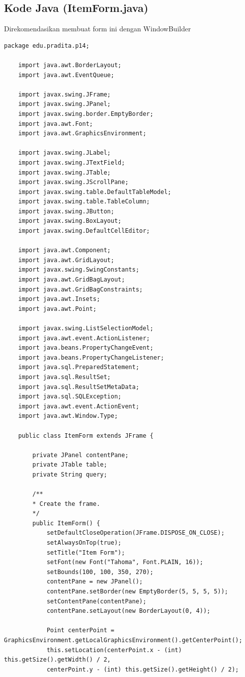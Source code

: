 \subsection{Kode Java (ItemForm.java)}

Direkomendasikan membuat form ini dengan WindowBuilder

\begin{lstlisting}[style=JavaStyle]
	package edu.pradita.p14;
	
	import java.awt.BorderLayout;
	import java.awt.EventQueue;
	
	import javax.swing.JFrame;
	import javax.swing.JPanel;
	import javax.swing.border.EmptyBorder;
	import java.awt.Font;
	import java.awt.GraphicsEnvironment;
	
	import javax.swing.JLabel;
	import javax.swing.JTextField;
	import javax.swing.JTable;
	import javax.swing.JScrollPane;
	import javax.swing.table.DefaultTableModel;
	import javax.swing.table.TableColumn;
	import javax.swing.JButton;
	import javax.swing.BoxLayout;
	import javax.swing.DefaultCellEditor;
	
	import java.awt.Component;
	import java.awt.GridLayout;
	import javax.swing.SwingConstants;
	import java.awt.GridBagLayout;
	import java.awt.GridBagConstraints;
	import java.awt.Insets;
	import java.awt.Point;
	
	import javax.swing.ListSelectionModel;
	import java.awt.event.ActionListener;
	import java.beans.PropertyChangeEvent;
	import java.beans.PropertyChangeListener;
	import java.sql.PreparedStatement;
	import java.sql.ResultSet;
	import java.sql.ResultSetMetaData;
	import java.sql.SQLException;
	import java.awt.event.ActionEvent;
	import java.awt.Window.Type;
	
	public class ItemForm extends JFrame {
		
		private JPanel contentPane;
		private JTable table;
		private String query;
		
		/**
		* Create the frame.
		*/
		public ItemForm() {
			setDefaultCloseOperation(JFrame.DISPOSE_ON_CLOSE);
			setAlwaysOnTop(true);
			setTitle("Item Form");
			setFont(new Font("Tahoma", Font.PLAIN, 16));
			setBounds(100, 100, 350, 270);
			contentPane = new JPanel();
			contentPane.setBorder(new EmptyBorder(5, 5, 5, 5));
			setContentPane(contentPane);
			contentPane.setLayout(new BorderLayout(0, 4));
			
			Point centerPoint = GraphicsEnvironment.getLocalGraphicsEnvironment().getCenterPoint();
			this.setLocation(centerPoint.x - (int) this.getSize().getWidth() / 2,
			centerPoint.y - (int) this.getSize().getHeight() / 2);
			

\end{lstlisting}
